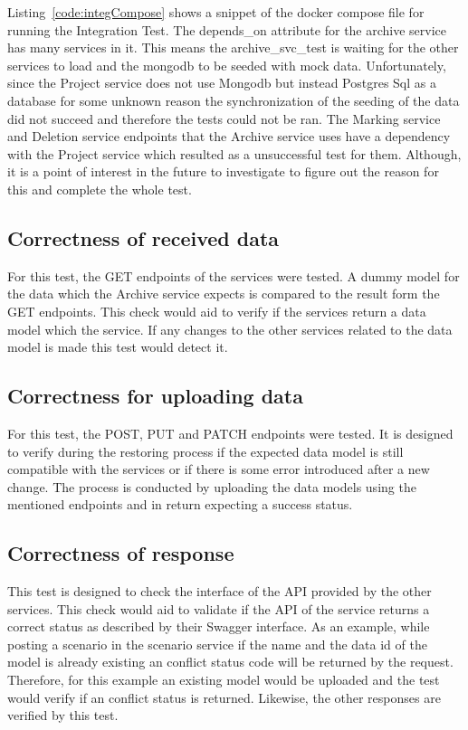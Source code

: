Listing~\ref{code:integCompose} shows a snippet of the docker compose file for running the Integration Test. The depends\_on attribute for the archive service
has many services in it. This means the archive\_svc\_test is waiting for the other services to load and the mongodb to be seeded with mock data. Unfortunately,
since the Project service does not use Mongodb but instead Postgres Sql as a database for some unknown reason the synchronization of the seeding of the data
did not succeed and therefore the tests could not be ran. The
Marking service and Deletion service endpoints that the Archive service uses have a dependency with the Project service  which resulted as a unsuccessful test
for them. Although, it is a point of interest in the future to investigate to figure out the reason for this and complete the whole test.

\subsection{Correctness of received data}
For this test, the GET endpoints of the services were tested. A dummy model for the data which the Archive service expects is compared to the result
form the GET endpoints. This check would aid to verify if the services return a data model which the service. If any changes to the other services
related to the data model is made this test would detect it. 

\subsection{Correctness for uploading data}
For this test, the POST, PUT and PATCH endpoints were tested. It is designed to verify during the restoring process if the expected data model 
is still compatible with the services or if there is some error introduced after a new change. The process is conducted by uploading the 
data models using the mentioned endpoints and in return expecting a success status.

\subsection{Correctness of response}
This test is designed to check the interface of the API provided by the other services. This check would aid to validate if the API of the
service returns a correct status as described by their Swagger interface. As an example, while posting a scenario in the scenario service if the
name and the data id of the model is already existing an conflict status code will be returned by the request. Therefore, for this example an existing
model would be uploaded and the test would verify if an conflict status is returned. Likewise, the other responses are verified by this test. 

